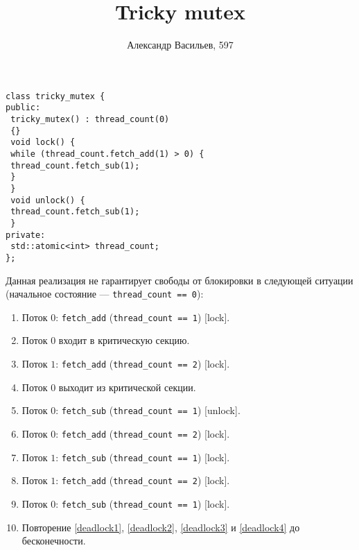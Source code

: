 \documentclass[a4paper]{paper}
\title{Tricky mutex}
\author{Александр Васильев, 597}
\begin{document}
 
\maketitle

\begin{lstlisting}
class tricky_mutex {
public:
 tricky_mutex() : thread_count(0)
 {}
 void lock() {
 while (thread_count.fetch_add(1) > 0) {
 thread_count.fetch_sub(1);
 }
 }
 void unlock() {
 thread_count.fetch_sub(1);
 }
private:
 std::atomic<int> thread_count;
};
\end{lstlisting}
Данная реализация не гарантирует свободы от блокировки в следующей ситуации
(начальное состояние --- \lstinline$thread_count == 0$):
\begin{enumerate}
\item Поток $0$: \lstinline$fetch_add$ (\lstinline$thread_count == 1$) [lock].
\item Поток $0$ входит в критическую секцию.
\item Поток $1$: \lstinline$fetch_add$ (\lstinline$thread_count == 2$) [lock].
\item Поток $0$ выходит из критической секции.
\item Поток $0$: \lstinline$fetch_sub$ (\lstinline$thread_count == 1$) [unlock].
\item\label{deadlock1} Поток $0$: \lstinline$fetch_add$ (\lstinline$thread_count == 2$) [lock].
\item\label{deadlock2} Поток $1$: \lstinline$fetch_sub$ (\lstinline$thread_count == 1$) [lock].
\item\label{deadlock3} Поток $1$: \lstinline$fetch_add$ (\lstinline$thread_count == 2$) [lock].
\item\label{deadlock4} Поток $0$: \lstinline$fetch_sub$ (\lstinline$thread_count == 1$) [lock].
\item Повторение \autoref{deadlock1}, \autoref{deadlock2}, \autoref{deadlock3}
	и \autoref{deadlock4} до бесконечности.
\end{enumerate}
\end{document}
